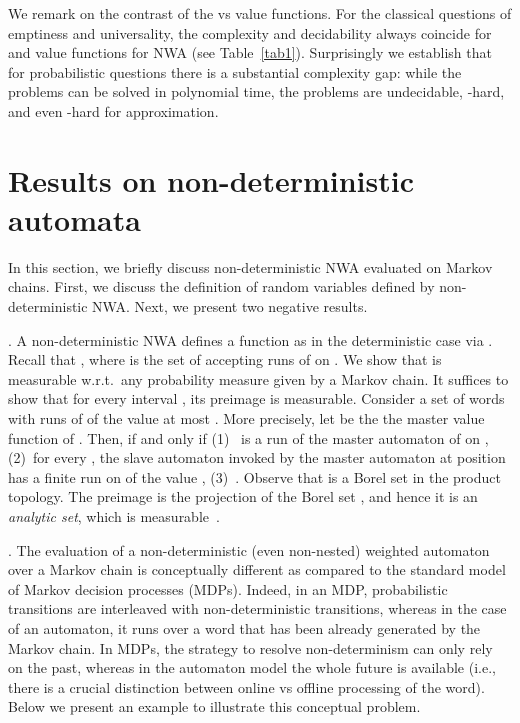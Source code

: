 \documentclass{lmcs}
\begin{document}
\begin{rem}[Contrast of  vs ]\label{remark:LimInf-vs-Inf}
We remark on the contrast of the  vs  value functions.
For the classical questions of emptiness and universality, the complexity and
decidability always coincide for  and  value functions for NWA
(see Table~\ref{tab1}).
Surprisingly we establish that for probabilistic questions there is a substantial
complexity gap: while the  problems can be solved in polynomial time, the
 problems are undecidable, -hard, and even -hard for approximation.
\end{rem}

\section{Results on non-deterministic automata}\label{s:nondeterminism}
In this section, we briefly discuss non-deterministic NWA evaluated on Markov chains.
First, we discuss the definition of random variables defined by non-deterministic NWA\@. Next, we present two negative results.

\smallskip{}.
A non-deterministic NWA  defines a function  as in the deterministic case via
.
Recall that , where  is the set of accepting runs of  on .
We show that  is measurable w.r.t.\ any probability measure given by a Markov chain.
It suffices to show that for every interval , its preimage  is measurable.
Consider a set  of words with runs of  of
the value at most . More precisely, let  be the the master value function of .
     Then,  if and only if
(1)~ is a run of the master automaton of  on ,
(2)~for every , the slave automaton invoked by the master automaton at position  has a finite run on  of the value
,
(3)~.
Observe that  is a Borel set in the product topology. The preimage  is
the projection of the Borel set , and hence it is an \emph{analytic set}, which is measurable~\cite{kechris}.




\smallskip{}.
The evaluation of a non-deterministic (even non-nested) weighted automaton over a Markov
chain is conceptually different as compared to the standard model of
Markov decision processes (MDPs).
Indeed, in an MDP, probabilistic transitions are interleaved with non-deterministic transitions,
whereas in the case of an automaton, it runs over a word that has been already generated by
the Markov chain.
In MDPs, the strategy to resolve non-determinism can only rely on the past, whereas
in the automaton model the whole future is available (i.e., there is a crucial distinction
between online vs offline processing of the word).
Below we present an example to illustrate
this conceptual problem.
\end{document}
